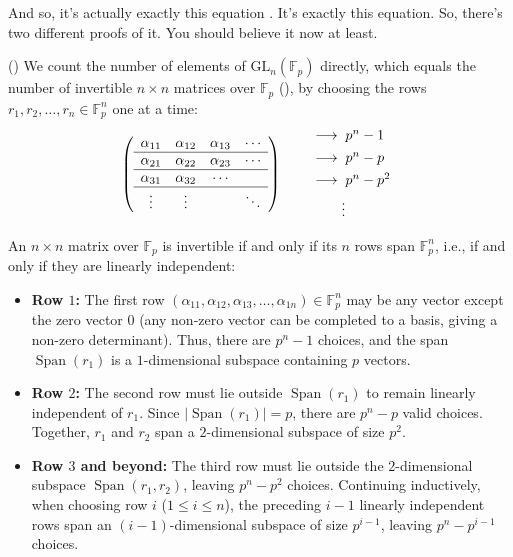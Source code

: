 \begin{proofWrapper}
\begin{speech}[01:24:27 - 01:25:42]
And so, it's actually exactly this equation . It's exactly this equation. So, there's two different proofs of it. You should believe it now at least.
\end{speech}

\begin{content}
() We count the number of elements of $\mathrm{GL}_n(\mathbb{F}_p)$ directly, which equals the number of invertible $n \times n$ matrices over $\mathbb{F}_p$ (), by choosing the rows $r_1, r_2, \dots, r_n \in \mathbb{F}_p^n$ one at a time:
\[
\begin{array}{c@{\qquad}l}
\left(
\begin{array}{cccc}
\alpha_{11} & \alpha_{12} & \alpha_{13} & \cdots \\
\hline
\alpha_{21} & \alpha_{22} & \alpha_{23} & \cdots \\
\hline
\alpha_{31} & \alpha_{32} & \cdots & \\
\hline
\vdots & \vdots & & \ddots
\end{array}
\right)
&
\begin{array}{l}
\longrightarrow \; p^n - 1 \\[4pt]
\longrightarrow \; p^n - p \\[4pt]
\longrightarrow \; p^n - p^2 \\[4pt]
\phantom{\longrightarrow} \; \vdots
\end{array}
\end{array}
\]

An $n \times n$ matrix over $\mathbb{F}_p$ is invertible if and only if its $n$ rows span $\mathbb{F}_p^n$, i.e., if and only if they are linearly independent:
\begin{itemize}
    \item \textbf{Row $1$:} The first row $(\alpha_{11}, \alpha_{12}, \alpha_{13}, \dots, \alpha_{1n}) \in \mathbb{F}_p^n$ may be any vector except the zero vector $0$ (any non-zero vector can be completed to a basis, giving a non-zero determinant). Thus, there are $p^n - 1$ choices, and the span $\operatorname{Span}(r_1)$ is a $1$-dimensional subspace containing $p$ vectors.
    \item \textbf{Row $2$:} The second row must lie outside $\operatorname{Span}(r_1)$ to remain linearly independent of $r_1$. Since $|\operatorname{Span}(r_1)| = p$, there are $p^n - p$ valid choices. Together, $r_1$ and $r_2$ span a $2$-dimensional subspace of size $p^2$.
    \item \textbf{Row $3$ and beyond:} The third row must lie outside the $2$-dimensional subspace $\operatorname{Span}(r_1, r_2)$, leaving $p^n - p^2$ choices. Continuing inductively, when choosing row $i$ ($1 \le i \le n$), the preceding $i - 1$ linearly independent rows span an $(i - 1)$-dimensional subspace of size $p^{i-1}$, leaving $p^n - p^{i-1}$ choices.
\end{itemize}


\end{content}
\end{proofWrapper}
